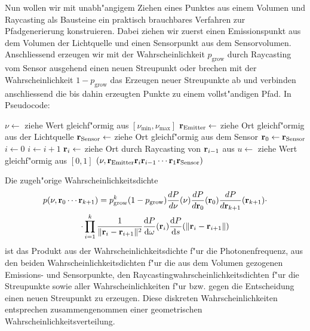 	Nun wollen wir mit unabh"angigem Ziehen eines Punktes aus einem Volumen und Raycasting als Bausteine ein praktisch brauchbares Verfahren zur Pfadgenerierung konstruieren. Dabei ziehen wir zuerst einen Emissionspunkt aus dem Volumen der Lichtquelle und einen Sensorpunkt aus dem Sensorvolumen. Anschliessend erzeugen wir mit der Wahrscheinlichkeit $p_\text{grow}$ durch Raycasting vom Sensor ausgehend einen neuen Streupunkt oder brechen mit der Wahrscheinlichkeit $1-p_\text{grow}$ das Erzeugen neuer Streupunkte ab und verbinden anschliessend die bis dahin erzeugten Punkte zu einem vollst"andigen Pfad. In Pseudocode:
	
	\begin{algorithmic}
		\STATE $\nu \leftarrow$ ziehe Wert gleichf"ormig aus $[\nu_\text{min},\nu_\text{max}]$
		\STATE $\mathbf{r}_\text{Emitter} \leftarrow$ ziehe Ort gleichf"ormig aus der Lichtquelle
		\STATE $\mathbf{r}_\text{Sensor} \leftarrow$ ziehe Ort gleichf"ormig aus dem Sensor
		\STATE $\mathbf{r}_0 \leftarrow \mathbf{r}_\text{Sensor}$
		\STATE $i \leftarrow 0$
		\REPEAT
			\STATE $i \leftarrow i+1$
			\STATE $\mathbf{r}_i \leftarrow$ ziehe Ort durch Raycasting von $\mathbf{r}_{i-1}$ aus
			\STATE $u \leftarrow$ ziehe Wert gleichf"ormig aus $[0,1]$
	  \RETURN $(\nu,\mathbf{r}_\text{Emitter}\mathbf{r}_i\mathbf{r}_{i-1}\cdots\mathbf{r}_1\mathbf{r}_\text{Sensor})$
	\end{algorithmic}
	
	Die zugeh"orige Wahrscheinlichkeitsdichte
	\begin{multline*}
		p(\nu,\mathbf{r}_0\cdots\mathbf{r}_{k+1})=p_\text{grow}^k(1-p_\text{grow})\frac{dP}{d\nu}(\nu)\frac{dP}{d\mathbf{r}_0}(\mathbf{r}_0)\frac{dP}{d\mathbf{r}_{k+1}}(\mathbf{r}_{k+1}) \cdot \\
	\cdot \prod_{i=1}^k \frac{1}{\|\mathbf{r}_i - \mathbf{r}_{i+1}\|^2} \frac{\text{d}P}{\text{d}\omega}(\mathbf{r}_i) \frac{\text{d}P}{\text{d}s}(\|\mathbf{r}_i-\mathbf{r}_{i+1}\|)
	\end{multline*}
	ist das Produkt aus der Wahrscheinlichkeitsdichte f"ur die Photonenfrequenz, aus den beiden Wahrscheinlichkeitsdichten f"ur die aus dem Volumen gezogenen Emissions- und Sensorpunkte, den Ray\-casting\-wahr\-schein\-lich\-keits\-dich\-ten f"ur die Streupunkte sowie aller Wahrscheinlichkeiten f"ur bzw. gegen die Entscheidung einen neuen Streupunkt zu erzeugen. Diese diskreten Wahrscheinlichkeiten entsprechen zusammengenommen einer geometrischen Wahrscheinlichkeitsverteilung.
	
